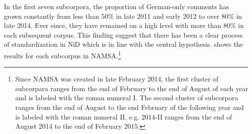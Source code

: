 \documentclass[output=paper]{langsci/langscibook}
\begin{document}
In the first seven subcorpora, the proportion of German-only comments has grown constantly from less than 50\% in late 2011 and early 2012 to over 80\% in late 2014. Ever since, they have remained on a high level with more than 80\% in each subsequent corpus. This finding suggest that there has been a clear process of standardization in NiD which is in line with the central hypothesis.  shows the results for each subcorpus in NAMSA.\footnote{Since NAMSA was created in late February 2014, the first cluster of subcorpara ranges from the end of February to the end of August of each year and is labeled with the roman numeral I. The second cluster of subcorpora ranges from the end of August to the end February of the following year and is labeled with the roman numeral II, e.g. 2014-II ranges from the end of August 2014 to the end of February 2015.} 
\end{document}
